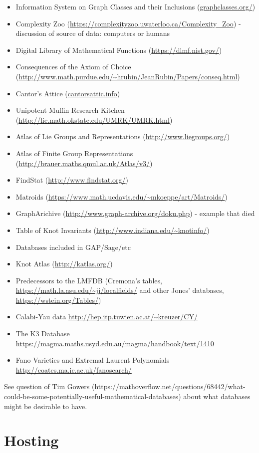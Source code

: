 \documentclass{article}
\begin{document}
\begin{itemize}
\item Information System on Graph Classes and their Inclusions (\url{graphclasses.org/})
\item Complexity Zoo (\url{https://complexityzoo.uwaterloo.ca/Complexity_Zoo}) - discussion of source of data: computers or humans
\item Digital Library of Mathematical Functions (\url{https://dlmf.nist.gov/})
\item Consequences of the Axiom of Choice (\url{http://www.math.purdue.edu/~hrubin/JeanRubin/Papers/conseq.html})
\item Cantor's Attice (\url{cantorsattic.info})
\item Unipotent Muffin Research Kitchen (\url{http://lie.math.okstate.edu/UMRK/UMRK.html})
\item Atlas of Lie Groups and Representations (\url{http://www.liegroups.org/})
\item Atlas of Finite Group Representations (\url{http://brauer.maths.qmul.ac.uk/Atlas/v3/})
\item FindStat (\url{http://www.findstat.org/})
\item Matroids (\url{https://www.math.ucdavis.edu/~mkoeppe/art/Matroids/})
\item GraphArichive (\url{http://www.graph-archive.org/doku.php}) - example that died
\item Table of Knot Invariants (\url{http://www.indiana.edu/~knotinfo/})
\item Databases included in GAP/Sage/etc
\item Knot Atlas (\url{http://katlas.org/})
\item Predecessors to the LMFDB (Cremona's tables, \url{https://math.la.asu.edu/~jj/localfields/} and other Jones' databases, \url{https://wstein.org/Tables/})
\item Calabi-Yau data \url{http://hep.itp.tuwien.ac.at/~kreuzer/CY/}
\item The K3 Database \url{https://magma.maths.usyd.edu.au/magma/handbook/text/1410}
\item Fano Varieties and Extremal Laurent Polynomials \url{http://coates.ma.ic.ac.uk/fanosearch/}
\end{itemize}

See question of Tim Gowers (https://mathoverflow.net/questions/68442/what-could-be-some-potentially-useful-mathematical-databases) about what databases might be desirable to have.

\section{Hosting}
\end{document}
